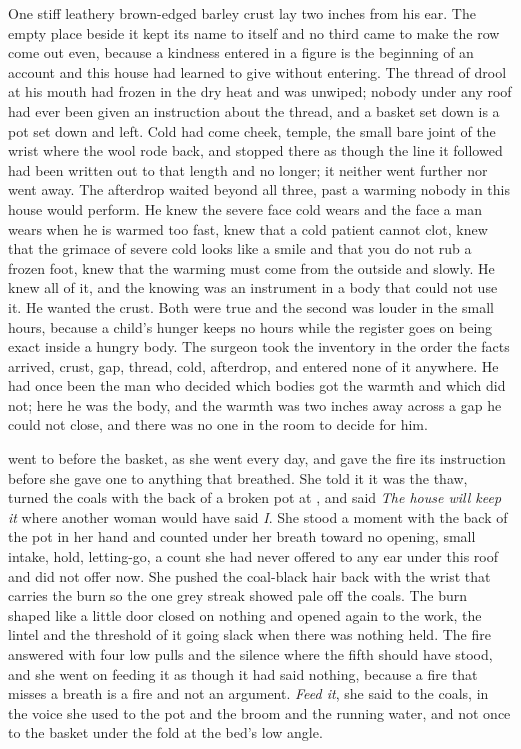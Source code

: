 One stiff leathery brown-edged barley crust lay two inches from his ear. The empty place beside it kept its name to itself and no third came to make the row come out even, because a kindness entered in a figure is the beginning of an account and this house had learned to give without entering. The thread of drool at his mouth had frozen in the dry heat and was unwiped; nobody under any roof had ever been given an instruction about the thread, and a basket set down is a pot set down and left. Cold had come cheek, temple, the small bare joint of the wrist where the wool rode back, and stopped there as though the line it followed had been written out to that length and no longer; it neither went further nor went away. The afterdrop waited beyond all three, past a warming nobody in this house would perform. He knew the severe face cold wears and the face a man wears when he is warmed too fast, knew that a cold patient cannot clot, knew that the grimace of severe cold looks like a smile and that you do not rub a frozen foot, knew that the warming must come from the outside and slowly. He knew all of it, and the knowing was an instrument in a body that could not use it. He wanted the crust. Both were true and the second was louder in the small hours, because a child's hunger keeps no hours while the register goes on being exact inside a hungry body. The surgeon took the inventory in the order the facts arrived, crust, gap, thread, cold, afterdrop, and entered none of it anywhere. He had once been the man who decided which bodies got the warmth and which did not; here he was the body, and the warmth was two inches away across a gap he could not close, and there was no one in the room to decide for him.

 went to  before the basket, as she went every day, and gave the fire its instruction before she gave one to anything that breathed. She told it it was the thaw, turned the coals with the back of a broken pot at , and said \emph{The house will keep it} where another woman would have said \emph{I}. She stood a moment with the back of the pot in her hand and counted under her breath toward no opening, small intake, hold, letting-go, a count she had never offered to any ear under this roof and did not offer now. She pushed the coal-black hair back with the wrist that carries the burn so the one grey streak showed pale off the coals. The burn shaped like a little door closed on nothing and opened again to the work, the lintel and the threshold of it going slack when there was nothing held. The fire answered with four low pulls and the silence where the fifth should have stood, and she went on feeding it as though it had said nothing, because a fire that misses a breath is a fire and not an argument. \emph{Feed it}, she said to the coals, in the voice she used to the pot and the broom and the running water, and not once to the basket under the fold at the bed's low angle.

